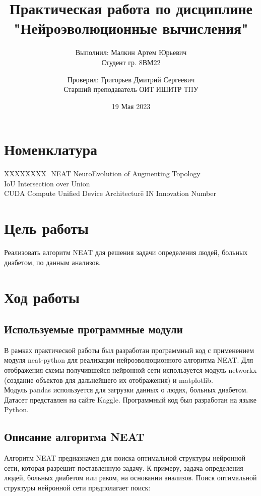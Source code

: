 \documentclass{article}
\title{Практическая работа по дисциплине "Нейроэволюционные вычисления"}
\author{Выполнил: Малкин Артем Юрьевич\\ Студент гр. 8ВМ22 \and Проверил: Григорьев Дмитрий Сергеевич\\ Старший преподаватель ОИТ ИШИТР ТПУ}
\date{19 Мая 2023}
\begin{document}
\maketitle

\section*{Номенклатура}
\label{sec:nomenclature}
\begin{tabbing}
    XXXXXXXX \= \kill%
	NEAT				\> NeuroEvolution of Augmenting Topology\\  
	IoU					\> Intersection over Union\\    
	CUDA				\> Compute Unified Device Architecture\= \kill    
	IN 					\> Innovation Number 
\end{tabbing}

\section*{Цель работы}
Реализовать алгоритм NEAT для решения задачи определения людей, больных диабетом, по данным анализов. 

\section{Ход работы}
\subsection{Используемые программные модули}

В рамках практической работы был разработан программный код с применением модуля neat-python для реализации нейроэволюционного алгоритма NEAT. Для отображения схемы получившейся нейронной сети используется модуль networkx (создание объектов для дальнейшего их отображения) и matplotlib. \\

Модуль pandas используется для загрузки данных о людях, больных диабетом. Датасет представлен на сайте Kaggle\cite{Kaggle_dataset}. Программный код был разработан на языке Python.


\subsection{Описание алгоритма NEAT}
Алгоритм NEAT предназначен для поиска оптимальной структуры нейронной сети, которая разрешит поставленную задачу. К примеру, задача определения людей, больных диабетом или раком, на основании анализов. Поиск оптимальной структуры нейронной сети предполагает поиск: 
\end{document}
